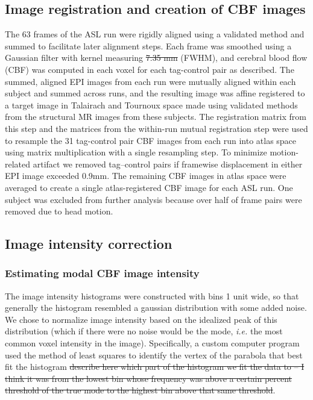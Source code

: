 \subsection{Image registration and creation of CBF images}
The 63 frames of the ASL run were rigidly aligned using a validated method\cite{Black_2001} and summed to facilitate later alignment steps. Each frame was smoothed using a Gaussian filter with kernel measuring \sout{7.35 mm} (FWHM), and cerebral blood flow (CBF) was computed in each voxel for each tag-control pair as described.\cite{Wang_2003} The summed, aligned EPI images from each run were mutually aligned within each subject and summed across runs, and the resulting image was affine registered to a target image in Talairach and Tournoux space made using validated methods from the structural MR images from these subjects.\cite{15130735} The registration matrix from this step and the matrices from the within-run mutual registration step were used to resample the 31 tag-control pair CBF images from each run into atlas space using matrix multiplication with a single resampling step. To minimize motion-related artifact we removed tag--control pairs if framewise displacement in either EPI image exceeded 0.9mm.\cite{23861343} The remaining CBF images in atlas space were averaged to create a single atlas-registered CBF image for each ASL run. One subject was excluded from further analysis because over half of frame pairs were removed due to head motion.

\subsection{Image intensity correction}
\subsubsection{Estimating modal CBF image intensity}
The image intensity histograms were constructed with bins 1 unit wide, so that generally the histogram resembled a gaussian distribution with some added noise. We chose to normalize image intensity based on the idealized peak of this distribution (which if there were no noise would be the mode, \textit{i.e.} the most common voxel intensity in the image).\cite{Ojemann_1997} Specifically, a custom computer program used the method of least squares to identify the vertex of the parabola that best fit the histogram \sout{describe here which part of the histogram we fit the data to -- I think it was from the lowest bin whose frequency was above a certain percent threshold of the true mode to the highest bin above that same threshold}.

